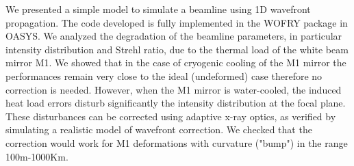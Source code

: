 \documentclass[]{spie}  %
\begin{document}
We presented a simple model to simulate a beamline using 1D wavefront propagation. The code developed is fully implemented in the WOFRY package in OASYS.
We analyzed the degradation of the beamline parameters, in particular intensity distribution and Strehl ratio, due to the thermal load of the white beam mirror M1. We showed that in the case of cryogenic cooling of the M1 mirror the performances remain very close to the ideal (undeformed) case therefore no correction is needed. However, when the M1 mirror is water-cooled, the induced heat load errors disturb significantly the intensity distribution at the focal plane. These disturbances can be corrected using adaptive x-ray optics, as verified by simulating a realistic model of wavefront correction. We checked that the correction would work for M1 deformations with curvature ("bump") in the range 100m-1000Km. 


   
\end{document}
